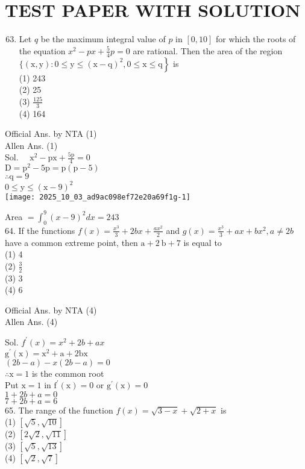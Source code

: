 \documentclass[10pt]{article}
\begin{document}
\section*{TEST PAPER WITH SOLUTION}
\begin{enumerate}
  \setcounter{enumi}{62}
  \item Let \(q\) be the maximum integral value of \(p\) in \([0,10]\) for which the roots of the equation \(x^{2}-p x+\frac{5}{4} p=0\) are rational. Then the area of the region \(\{(\mathrm{x}, \mathrm{y}): 0 \leq \mathrm{y} \left.\leq(\mathrm{x}-\mathrm{q})^{2}, 0 \leq \mathrm{x} \leq \mathrm{q}\right\}\) is\\
(1) 243\\
(2) 25\\
(3) \(\frac{125}{3}\)\\
(4) 164
\end{enumerate}

Official Ans. by NTA (1)\\
Allen Ans. (1)\\
Sol. \(\quad \mathrm{x}^{2}-\mathrm{px}+\frac{5 \mathrm{p}}{4}=0\)\\
\(\mathrm{D}=\mathrm{p}^{2}-5 \mathrm{p}=\mathrm{p}(\mathrm{p}-5)\)\\
\(\therefore \mathrm{q}=9\)\\
\(0 \leq \mathrm{y} \leq(\mathrm{x}-9)^{2}\)\\
\texttt{[image: 2025\_10\_03\_ad9ac098ef72e20a69f1g-1]}

Area \(=\int_{0}^{9}(x-9)^{2} d x=243\)\\
64. If the functions \(f(x)=\frac{x^{3}}{3}+2 b x+\frac{a x^{2}}{2}\) and \(g(x)=\frac{x^{3}}{3}+a x+b x^{2}, a \neq 2 b\) have a common extreme point, then \(\mathrm{a}+2 \mathrm{~b}+7\) is equal to\\
(1) 4\\
(2) \(\frac{3}{2}\)\\
(3) 3\\
(4) 6

Official Ans. by NTA (4)\\
Allen Ans. (4)

Sol. \(f^{\prime}(x)=x^{2}+2 b+a x\)\\
\(\mathrm{g}^{\prime}(\mathrm{x})=\mathrm{x}^{2}+\mathrm{a}+2 \mathrm{bx}\)\\
\((2 b-a)-x(2 b-a)=0\)\\
\(\therefore \mathrm{x}=1\) is the common root\\
Put \(\mathrm{x}=1\) in \(\mathrm{f}^{\prime}(\mathrm{x})=0\) or \(\mathrm{g}^{\prime}(\mathrm{x})=0\)\\
\(1+2 b+a=0\)\\
\(7+2 b+a=6\)\\
65. The range of the function \(f(x)=\sqrt{3-x}+\sqrt{2+x}\) is\\
(1) \([\sqrt{5}, \sqrt{10}]\)\\
(2) \([2 \sqrt{2}, \sqrt{11}]\)\\
(3) \([\sqrt{5}, \sqrt{13}]\)\\
(4) \([\sqrt{2}, \sqrt{7}]\)
\end{document}
